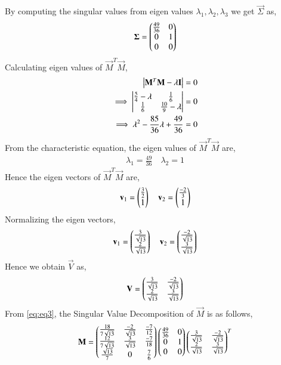 \documentclass[journal,12pt,twocolumn]{IEEEtran}
\begin{document}
By computing the singular values from eigen values $\lambda_1, \lambda_2, \lambda_3$ we get $\vec{\Sigma}$ as,
\begin{align}
\mathbf{\Sigma}=\begin{pmatrix}\frac{49}{36}&0\\0&1\\0&0\end{pmatrix}
\end{align}
Calculating eigen values of $\vec{M}^T\vec{M}$,
\begin{align}
\begin{vmatrix}\mathbf{M}^T\mathbf{M} - \lambda\mathbf{I}\end{vmatrix} &= 0\\
\implies\begin{vmatrix}\frac{5}{4}-\lambda&\frac{1}{6}\\\frac{1}{6}&\frac{10}{9}-\lambda\end{vmatrix} &=0\\
\implies\lambda^2-\frac{85}{36}\lambda+\frac{49}{36} &=0
\end{align}
From the characteristic equation, the eigen values of $\vec{M}^T\vec{M}$ are,
\begin{align}
\lambda_1 = \frac{49}{36}\quad
\lambda_2 = 1
\end{align}
Hence the eigen vectors of $\vec{M}^T\vec{M}$ are,
\begin{align}
\mathbf{v}_1=\begin{pmatrix}\frac{3}{2}\\1\end{pmatrix} \quad
\mathbf{v}_2=\begin{pmatrix}\frac{-2}{3}\\1\end{pmatrix}
\end{align}
Normalizing the eigen vectors,
\begin{align}
\mathbf{v}_1=\begin{pmatrix}\frac{3}{\sqrt{13}}\\\frac{2}{\sqrt{13}}\end{pmatrix} \quad
\mathbf{v}_2=\begin{pmatrix}\frac{-2}{\sqrt{13}}\\\frac{3}{\sqrt{13}}\end{pmatrix}
\end{align}
Hence we obtain $\vec{V}$ as,
\begin{align}
\mathbf{V}=\begin{pmatrix}\frac{3}{\sqrt{13}}&\frac{-2}{\sqrt{13}}\\\frac{2}{\sqrt{13}}&\frac{3}{\sqrt{13}}\end{pmatrix}
\end{align}
From \eqref{eq:eq3}, the Singular Value Decomposition of $\vec{M}$ is as follows,
\begin{align}
\mathbf{M} = \begin{pmatrix}\frac{18}{7\sqrt{13}}&\frac{-2}{\sqrt{13}}&\frac{-7}{12}\\\frac{12}{7\sqrt{13}}&\frac{3}{\sqrt{13}}&\frac{-7}{18}\\\frac{\sqrt{13}}{7}&0&\frac{7}{6}\end{pmatrix}\begin{pmatrix}\frac{49}{36}&0\\0&1\\0&0\end{pmatrix}\begin{pmatrix}\frac{3}{\sqrt{13}}&\frac{-2}{\sqrt{13}}\\\frac{2}{\sqrt{13}}&\frac{3}{\sqrt{13}}\end{pmatrix}^T
\end{align}
\end{document}
